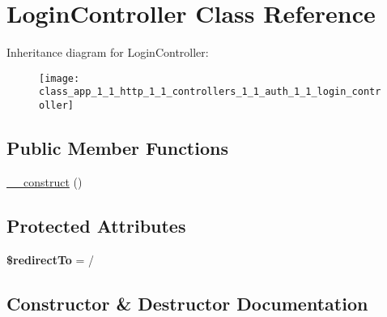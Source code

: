 \hypertarget{class_app_1_1_http_1_1_controllers_1_1_auth_1_1_login_controller}{}\section{Login\+Controller Class Reference}
\label{class_app_1_1_http_1_1_controllers_1_1_auth_1_1_login_controller}
Inheritance diagram for Login\+Controller\+:\begin{figure}[H]
\begin{center}
\leavevmode
\texttt{[image: class\_app\_1\_1\_http\_1\_1\_controllers\_1\_1\_auth\_1\_1\_login\_controller]}
\end{center}
\end{figure}
\subsection*{Public Member Functions}
\begin{DoxyCompactItemize}
\item 
\mbox{\hyperlink{class_app_1_1_http_1_1_controllers_1_1_auth_1_1_login_controller_a095c5d389db211932136b53f25f39685}{\+\_\+\+\_\+construct}} ()
\end{DoxyCompactItemize}
\subsection*{Protected Attributes}
\begin{DoxyCompactItemize}
\item 
\mbox{\label{class_app_1_1_http_1_1_controllers_1_1_auth_1_1_login_controller_a1d19101ee5de7186666ce86a530cd501}} 
{\bfseries \$redirect\+To} = \textquotesingle{}/\textquotesingle{}
\end{DoxyCompactItemize}


\subsection{Constructor \& Destructor Documentation}
\mbox{\label{class_app_1_1_http_1_1_controllers_1_1_auth_1_1_login_controller_a095c5d389db211932136b53f25f39685}} 
